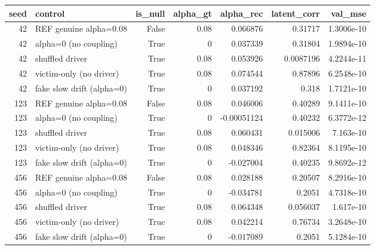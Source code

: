 \begin{tabular}{rlrrrrr}
\toprule
seed & control & is_null & alpha_gt & alpha_rec & latent_corr & val_mse \\
\midrule
42 & REF genuine alpha=0.08 & False & 0.08 & 0.066876 & 0.31717 & 1.3006e-10 \\
42 & alpha=0 (no coupling) & True & 0 & 0.037339 & 0.31804 & 1.9894e-10 \\
42 & shuffled driver & True & 0.08 & 0.053926 & 0.0087196 & 4.2244e-11 \\
42 & victim-only (no driver) & True & 0.08 & 0.074544 & 0.87896 & 6.2548e-10 \\
42 & fake slow drift (alpha=0) & True & 0 & 0.037192 & 0.318 & 1.7121e-10 \\
123 & REF genuine alpha=0.08 & False & 0.08 & 0.046006 & 0.40289 & 9.1411e-10 \\
123 & alpha=0 (no coupling) & True & 0 & -0.00051124 & 0.40232 & 6.3772e-12 \\
123 & shuffled driver & True & 0.08 & 0.060431 & 0.015006 & 7.163e-10 \\
123 & victim-only (no driver) & True & 0.08 & 0.048346 & 0.82364 & 8.1195e-10 \\
123 & fake slow drift (alpha=0) & True & 0 & -0.027004 & 0.40235 & 9.8692e-12 \\
456 & REF genuine alpha=0.08 & False & 0.08 & 0.028188 & 0.20507 & 8.2916e-10 \\
456 & alpha=0 (no coupling) & True & 0 & -0.034781 & 0.2051 & 4.7318e-10 \\
456 & shuffled driver & True & 0.08 & 0.064348 & 0.056037 & 1.617e-10 \\
456 & victim-only (no driver) & True & 0.08 & 0.042214 & 0.76734 & 3.2648e-10 \\
456 & fake slow drift (alpha=0) & True & 0 & -0.017089 & 0.2051 & 5.1284e-10 \\
\bottomrule
\end{tabular}
